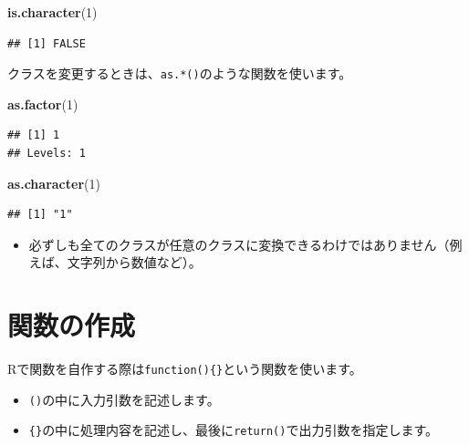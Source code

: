 \documentclass[]{bxjsreport}
\newenvironment{Shaded}{\begin{snugshade}}{\end{snugshade}}
\newcommand{\DecValTok}[1]{\textcolor[rgb]{0.00,0.00,0.81}{#1}}
\newcommand{\KeywordTok}[1]{\textcolor[rgb]{0.13,0.29,0.53}{\textbf{#1}}}
\newcommand{\NormalTok}[1]{#1}
\providecommand{\tightlist}{%
  \setlength{\itemsep}{0pt}\setlength{\parskip}{0pt}}
\let\asdf\section
\renewcommand{\section}{\chapter}
\renewcommand{\subsection}{\asdf}
\begin{document}
\begin{Shaded}
\begin{Highlighting}[]
\KeywordTok{is.character}\NormalTok{(}\DecValTok{1}\NormalTok{)}
\end{Highlighting}
\end{Shaded}

\begin{verbatim}
## [1] FALSE
\end{verbatim}

クラスを変更するときは、\texttt{as.*()}のような関数を使います。

\begin{Shaded}
\begin{Highlighting}[]
\KeywordTok{as.factor}\NormalTok{(}\DecValTok{1}\NormalTok{)}
\end{Highlighting}
\end{Shaded}

\begin{verbatim}
## [1] 1
## Levels: 1
\end{verbatim}

\begin{Shaded}
\begin{Highlighting}[]
\KeywordTok{as.character}\NormalTok{(}\DecValTok{1}\NormalTok{)}
\end{Highlighting}
\end{Shaded}

\begin{verbatim}
## [1] "1"
\end{verbatim}

\begin{itemize}
\tightlist
\item
  必ずしも全てのクラスが任意のクラスに変換できるわけではありません（例えば、文字列から数値など）。
\end{itemize}

\hypertarget{ux95a2ux6570ux306eux4f5cux6210}{%
\subsection{関数の作成}\label{ux95a2ux6570ux306eux4f5cux6210}}

Rで関数を自作する際は\texttt{function()\{\}}という関数を使います。

\begin{itemize}
\tightlist
\item
  \texttt{()}の中に入力引数を記述します。
\item
  \texttt{\{\}}の中に処理内容を記述し、最後に\texttt{return()}で出力引数を指定します。
\end{itemize}
\end{document}
